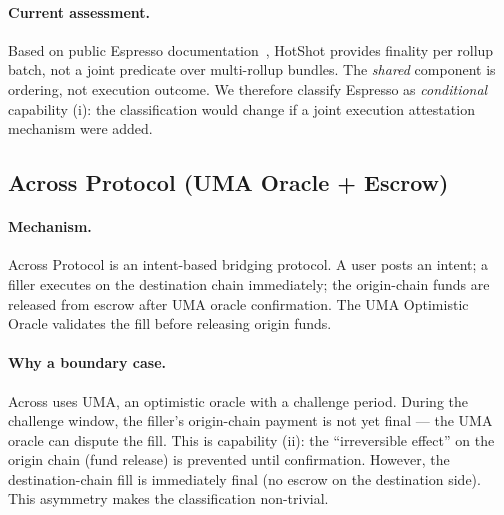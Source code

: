 \paragraph{Current assessment.}
Based on public Espresso documentation~\cite{espresso-docs}, HotShot provides
finality per rollup batch, not a joint predicate over multi-rollup bundles.
The \emph{shared} component is ordering, not execution outcome. We therefore
classify Espresso as \emph{conditional} capability (i): the classification
would change if a joint execution attestation mechanism were added.


\subsection{Across Protocol (UMA Oracle + Escrow)}
\label{app:across}

\paragraph{Mechanism.}
Across Protocol is an intent-based bridging protocol. A user posts an intent;
a filler executes on the destination chain immediately; the origin-chain funds
are released from escrow after UMA oracle confirmation. The UMA Optimistic
Oracle validates the fill before releasing origin funds.

\paragraph{Why a boundary case.}
Across uses UMA, an optimistic oracle with a challenge period. During the
challenge window, the filler's origin-chain payment is not yet final --- the
UMA oracle can dispute the fill. This is capability (ii): the ``irreversible
effect'' on the origin chain (fund release) is prevented until confirmation.
However, the destination-chain fill is immediately final (no escrow on the
destination side). This asymmetry makes the classification non-trivial.


